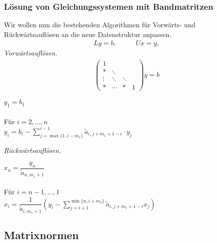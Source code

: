 \subsubsection{Lösung von Gleichungssystemen mit Bandmatritzen}

Wir wollen nun die bestehenden Algorithmen für Vorwärts- und Rückwärtsauflösen
an die neue Datenstruktur anpassen.
\begin{align*}
Ly = b,& \qquad Ux = y,
\end{align*}
\textit{Vorwärtsauflösen.}
\begin{align*}
\begin{pmatrix}
1 & & \\
* & \ddots \\
\vdots & \ddots & \ddots \\
* & \cdots & * & 1
\end{pmatrix}
y = b
\end{align*}

\begin{tabbing}
\hspace{20pt}	$y_1 = b_1$\\
\\
\hspace{20pt}	Für $i=2,\ldots,n$\\
\hspace{40pt}		$y_i = b_i - \sum\limits_{j=\max\{1,i-m_1\}}^{i-1}
				     \tilde{a}_{i,j+m_1+1-i}\cdot y_j$\\
\hspace{20pt}		
\end{tabbing}

\textit{Rückwärtsauflösen.}

\begin{tabbing}
\hspace{20pt}	$x_n = \dfrac{y_n}{\tilde{a}_{n,m_1+1}}$\\
\\
\hspace{20pt}	Für $i=n-1,\ldots,1$\\
\hspace{40pt}		$x_i = \dfrac{1}{\tilde{a}_{i,m_1+1}}\left(y_i -
\sum\limits_{j=i+1}^{\min\{n,i+m_2\}} \tilde{a}_{i,j+m_1+1-i}x_j \right)$\\
\hspace{20pt}		
\end{tabbing}


\subsection{Matrixnormen}

